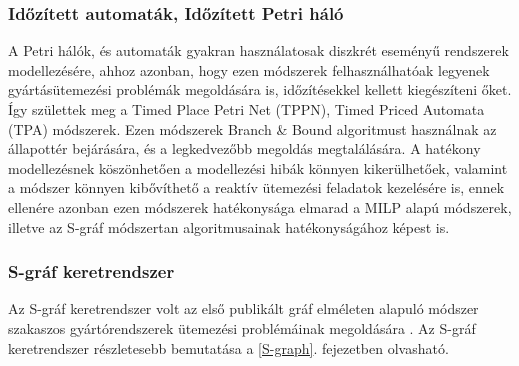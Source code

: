 \subsubsection{Időzített automaták, Időzített Petri háló}
A Petri hálók, és automaták gyakran használatosak diszkrét eseményű rendszerek modellezésére, ahhoz azonban, hogy ezen módszerek felhasználhatóak legyenek gyártásütemezési problémák megoldására is, időzítésekkel kellett kiegészíteni őket.
Így születtek meg a Timed Place Petri Net (TPPN), Timed Priced Automata (TPA) módszerek.
Ezen módszerek Branch \& Bound algoritmust használnak az állapottér bejárására, és a legkedvezőbb megoldás megtalálására.
A hatékony modellezésnek köszönhetően a modellezési hibák könnyen kikerülhetőek, valamint a módszer könnyen kibővíthető a reaktív ütemezési feladatok kezelésére is, ennek ellenére azonban ezen módszerek hatékonysága elmarad a MILP alapú módszerek, illetve az S-gráf módszertan algoritmusainak hatékonyságához képest is.  
\subsubsection{S-gráf keretrendszer}
Az S-gráf keretrendszer volt az első publikált gráf elméleten alapuló módszer szakaszos gyártórendszerek ütemezési problémáinak megoldására \cite{Sanmarti2002}. 
Az S-gráf keretrendszer részletesebb bemutatása a \ref{S-graph}. fejezetben olvasható. 
